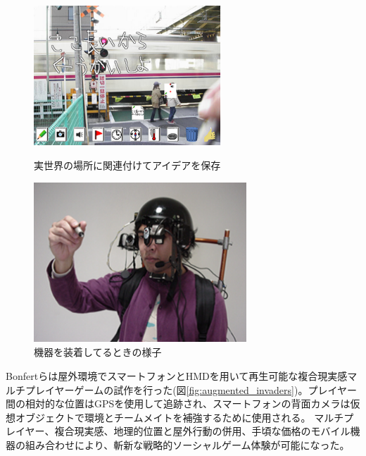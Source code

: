 \documentclass[11pt,a4j, titlepage]{jarticle} %
\begin{document}
\begin{figure}[H]
  \begin{center}
    \includegraphics[clip,height=6.0cm,width=7.0cm]{./informal.eps}
    \caption{実世界の場所に関連付けてアイデアを保存}
    \label{fig:informal}
  \end{center}
\end{figure}

\begin{figure}[H]
  \begin{center}
    \includegraphics[clip,height=6.0cm,width=8.0cm]{./informal2.eps}
    \caption{機器を装着してるときの様子}
    \label{fig:informal2}
  \end{center}
\end{figure}

Bonfertら\cite{bonfert}は屋外環境でスマートフォンとHMDを用いて再生可能な複合現実感マルチプレイヤーゲームの試作を行った(図\ref{fig:augmented_invaders})。プレイヤー間の相対的な位置はGPSを使用して追跡され、スマートフォンの背面カメラは仮想オブジェクトで環境とチームメイトを補強するために使用される。 マルチプレイヤー、複合現実感、地理的位置と屋外行動の併用、手頃な価格のモバイル機器の組み合わせにより、斬新な戦略的ソーシャルゲーム体験が可能になった。
\end{document}
